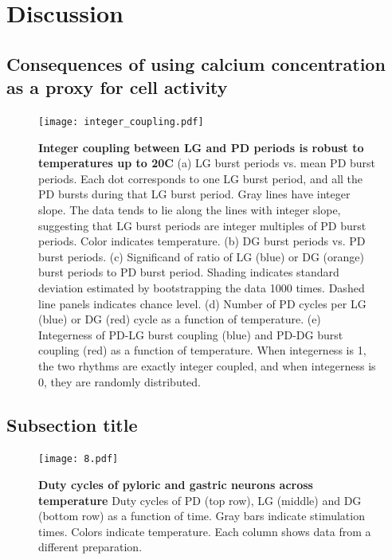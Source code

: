 \documentclass[9pt,lineno]{elife}
\begin{document}
\section{Discussion}




\subsection{Consequences of using calcium concentration as a proxy for cell activity}

\lipsum[5]

\begin{figure}[!htp]
\centering
\begin{fullwidth}
\texttt{[image: integer\_coupling.pdf]}
\end{fullwidth}
\caption{\textbf{Integer coupling between LG and PD periods is robust to temperatures up to 20\degree C} (a) LG burst periods vs. mean PD burst periods. Each dot corresponds to one LG burst period, and all the PD bursts during that LG burst period. Gray lines have integer slope. The data tends to lie along the lines with integer slope, suggesting that LG burst periods are integer multiples of PD burst periods. Color indicates temperature. (b) DG burst periods vs. PD burst periods. (c) Significand of ratio of LG (blue) or DG (orange) burst periods to PD burst period. Shading indicates standard deviation estimated by bootstrapping the data 1000 times.  Dashed line panels indicates chance level. (d) Number of PD cycles per LG (blue) or DG (red) cycle as a function of temperature. (e) Integerness of PD-LG burst coupling (blue) and PD-DG burst coupling (red) as a function of temperature. When integerness is 1, the two rhythms are exactly integer coupled, and when integerness is 0, they are randomly distributed.   }
\end{figure}


\lipsum[1]

\subsection{Subsection title}

\lipsum[2]


\begin{figure}
\begin{fullwidth}
\texttt{[image: 8.pdf]}

\caption{\textbf{Duty cycles of pyloric and gastric neurons across temperature } Duty cycles of PD (top row), LG (middle) and DG (bottom row) as a function of time. Gray bars indicate stimulation times. Colors indicate temperature. Each column shows data from a different preparation.    } 
\label{fig:8}
\end{fullwidth}
\end{figure}
\end{document}
